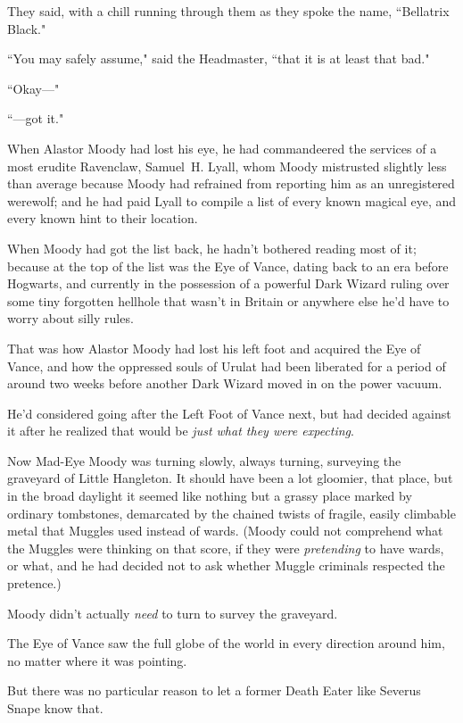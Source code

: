 They said, with a chill running through them as they spoke the name, ``Bellatrix Black."

``You may safely assume," said the Headmaster, ``that it is at least that bad."

``Okay---"

``---got it."


When Alastor Moody had lost his eye, he had commandeered the services of a most erudite Ravenclaw, Samuel~H. Lyall, whom Moody mistrusted slightly less than average because Moody had refrained from reporting him as an unregistered werewolf; and he had paid Lyall to compile a list of every known magical eye, and every known hint to their location.

When Moody had got the list back, he hadn't bothered reading most of it; because at the top of the list was the Eye of Vance, dating back to an era before Hogwarts, and currently in the possession of a powerful Dark Wizard ruling over some tiny forgotten hellhole that wasn't in Britain or anywhere else he'd have to worry about silly rules.

That was how Alastor Moody had lost his left foot and acquired the Eye of Vance, and how the oppressed souls of Urulat had been liberated for a period of around two weeks before another Dark Wizard moved in on the power vacuum.

He'd considered going after the Left Foot of Vance next, but had decided against it after he realized that would be \emph{just what they were expecting}.

Now Mad-Eye Moody was turning slowly, always turning, surveying the graveyard of Little Hangleton. It should have been a lot gloomier, that place, but in the broad daylight it seemed like nothing but a grassy place marked by ordinary tombstones, demarcated by the chained twists of fragile, easily climbable metal that Muggles used instead of wards. (Moody could not comprehend what the Muggles were thinking on that score, if they were \emph{pretending} to have wards, or what, and he had decided not to ask whether Muggle criminals respected the pretence.)

Moody didn't actually \emph{need} to turn to survey the graveyard.

The Eye of Vance saw the full globe of the world in every direction around him, no matter where it was pointing.

But there was no particular reason to let a former Death Eater like Severus Snape know that.

